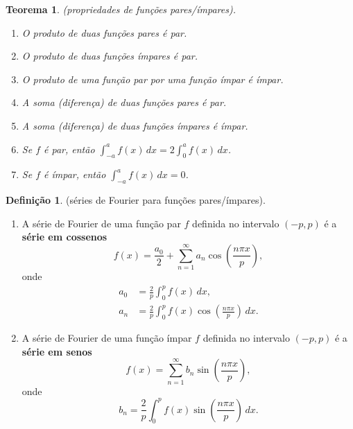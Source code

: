 \documentclass{article}
\theoremstyle{plain}
\newtheorem{thm}{Teorema}[section]
\theoremstyle{definition}
\newtheorem{defn}{Definição}[section]
\theoremstyle{remark}
\begin{document}
\begin{thm} (propriedades de funções pares/ímpares).
    \begin{enumerate}
        \item[\textup{(a)}] O produto de duas funções pares é par.
        \item[\textup{(b)}] O produto de duas funções ímpares é par.
        \item[\textup{(c)}] O produto de uma função par por uma função ímpar é ímpar.
        \item[\textup{(d)}] A soma (diferença) de duas funções pares é par.
        \item[\textup{(e)}] A soma (diferença) de duas funções ímpares é ímpar.
        \item[\textup{(f)}] Se \(f\) é par, então \(\int_{-a}^{a} f(x) \, dx = 2\int_{0}^{a} f(x) \, dx\).
        \item[\textup{(g)}] Se \(f\) é ímpar, então \(\int_{-a}^{a} f(x) \, dx = 0\).
    \end{enumerate}
\end{thm}

\begin{defn} (séries de Fourier para funções pares/ímpares).
    \begin{enumerate}
        \item[(i)] A série de Fourier de uma função par \(f\) definida no intervalo \((-p,p)\) é a \textbf{série em cossenos}
        \begin{equation}
            f(x) = \frac{a_0}{2} + \sum_{n=1}^{\infty} a_n \cos\left(\frac{n\pi x}{p}\right),
        \end{equation}
        \noindent onde 
        \begin{align}
            a_0 &= \frac{2}{p} \int_{0}^{p} f(x) \, dx, \\
            a_n &= \frac{2}{p} \int_{0}^{p} f(x) \cos\left(\frac{n\pi x}{p}\right) \, dx.
        \end{align}
        \item[(ii)] A série de Fourier de uma função ímpar \(f\) definida no intervalo \((-p,p)\) é a \textbf{série em senos}
        \begin{equation}
            f(x) = \sum_{n=1}^{\infty} b_n \sin\left(\frac{n\pi x}{p}\right),
        \end{equation}
        \noindent onde
        \begin{equation}
            b_n = \frac{2}{p} \int_{0}^{p} f(x) \sin\left(\frac{n\pi x}{p}\right) \, dx.
        \end{equation}
    \end{enumerate}
\end{defn}
\end{document}
